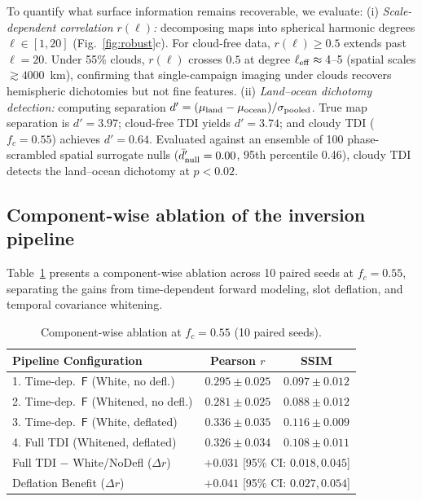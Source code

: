 \documentclass[twocolumn]{emulateapj}
\begin{document}
To quantify what surface information remains recoverable, we evaluate:
(i) {\it Scale-dependent correlation $r(\ell)$:} decomposing maps into spherical
harmonic degrees $\ell\in[1,20]$ (Fig.~\ref{fig:robust}c). For cloud-free data,
$r(\ell)\ge0.5$ extends past $\ell=20$. Under 55\% clouds, $r(\ell)$ crosses
$0.5$ at degree $\ell_{\rm eff}\approx4$--5 (spatial scales $\gtrsim4000$~km),
confirming that single-campaign imaging under clouds recovers hemispheric
dichotomies but not fine features.
(ii) {\it Land--ocean dichotomy detection:} computing separation $d'=(\mu_{\rm land}-\mu_{\rm ocean})/\sigma_{\rm pooled}$.
True map separation is $d'=3.97$; cloud-free TDI yields $d'=3.74$; and cloudy
TDI ($f_c=0.55$) achieves $d'=0.64$. Evaluated against an ensemble of 100
phase-scrambled spatial surrogate nulls ($\bar{d}'_{\rm null}=0.00$, 95th
percentile 0.46), cloudy TDI detects the land--ocean dichotomy at $p<0.02$.

\subsection{Component-wise ablation of the inversion pipeline}
\label{sec:ablation}
Table~\ref{tab:ablation} presents a component-wise ablation across 10 paired
seeds at $f_c=0.55$, separating the gains from time-dependent forward modeling,
slot deflation, and temporal covariance whitening.

\begin{table}[t]
\centering
\caption{Component-wise ablation at $f_c=0.55$ (10 paired seeds).}
\label{tab:ablation}
\footnotesize
\setlength{\tabcolsep}{2.2pt}
\begin{tabular}{lcc}
\toprule
Pipeline Configuration & Pearson $r$ & SSIM \\
\midrule
1. Time-dep.\ $\mathsf{F}$ (White, no defl.)     & $0.295\pm0.025$ & $0.097\pm0.012$ \\
2. Time-dep.\ $\mathsf{F}$ (Whitened, no defl.)  & $0.281\pm0.025$ & $0.088\pm0.012$ \\
3. Time-dep.\ $\mathsf{F}$ (White, deflated)     & $0.336\pm0.035$ & $0.116\pm0.009$ \\
4. Full TDI (Whitened, deflated)                 & $0.326\pm0.034$ & $0.108\pm0.011$ \\
\midrule
Full TDI $-$ White/NoDefl ($\Delta r$)   & \multicolumn{2}{c}{$+0.031$ [95\% CI: $0.018, 0.045$]} \\
Deflation Benefit ($\Delta r$)           & \multicolumn{2}{c}{$+0.041$ [95\% CI: $0.027, 0.054$]} \\
\bottomrule
\end{tabular}
\end{table}
\end{document}
